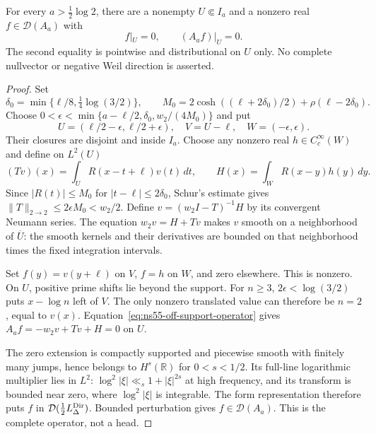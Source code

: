 \begin{proposition}
\label{prop:ns55-local-ucp-counterexample}
For every $a>\tfrac12\log2$, there are a nonempty $U\Subset I_a$
and a nonzero real $f\in\mathcal D(A_a)$ with
\[
 f|_U=0,\qquad (A_af)|_U=0.
\]
The second equality is pointwise and distributional on $U$ only.
No complete nullvector or negative Weil direction is asserted.
\end{proposition}
\begin{proof}
Set
\[
 \delta_0=\min\{\ell/8,\tfrac14\log(3/2)\},\qquad
 M_0=2\cosh((\ell+2\delta_0)/2)+\rho(\ell-2\delta_0).
\]
Choose $0<\epsilon<\min\{a-\ell/2,\delta_0,w_2/(4M_0)\}$ and put
\[
 U=(\ell/2-\epsilon,\ell/2+\epsilon),\quad V=U-\ell,\quad
 W=(-\epsilon,\epsilon).
\]
Their closures are disjoint and inside $I_a$. Choose any nonzero real
$h\in C_c^\infty(W)$ and define on $L^2(U)$
\[
 (Tv)(x)=\int_U R(x-t+\ell)v(t)\,dt,\qquad
 H(x)=\int_W R(x-y)h(y)\,dy .
\]
Since $|R(t)|\le M_0$ for $|t-\ell|\le2\delta_0$, Schur's estimate
gives $\|T\|_{2\to2}\le2\epsilon M_0<w_2/2$. Define
$v=(w_2I-T)^{-1}H$ by its convergent Neumann series. The equation
$w_2v=H+Tv$ makes $v$ smooth on a neighborhood of $\overline U$:
the smooth kernels and their derivatives are bounded on that
neighborhood times the fixed integration intervals.

Set $f(y)=v(y+\ell)$ on $V$, $f=h$ on $W$, and zero elsewhere.
This is nonzero. On $U$, positive prime shifts lie beyond the support.
For $n\ge3$, $2\epsilon<\log(3/2)$ puts $x-\log n$ left of $V$.
The only nonzero translated value can therefore be $n=2$, equal to
$v(x)$. Equation~\eqref{eq:ns55-off-support-operator} gives
$A_af=-w_2v+Tv+H=0$ on $U$.

The zero extension is compactly supported and piecewise smooth with
finitely many jumps, hence belongs to $H^s(\mathbb R)$ for
$0<s<1/2$. Its full-line logarithmic multiplier lies in $L^2$:
$\log^2|\xi|\ll_s1+|\xi|^{2s}$ at high frequency, and its transform
is bounded near zero, where $\log^2|\xi|$ is integrable. The form
representation therefore puts $f$ in
$\mathcal D(\tfrac12L_\Delta^{\rm Dir})$. Bounded perturbation
gives $f\in\mathcal D(A_a)$. This is the complete operator, not a head.
\end{proof}

